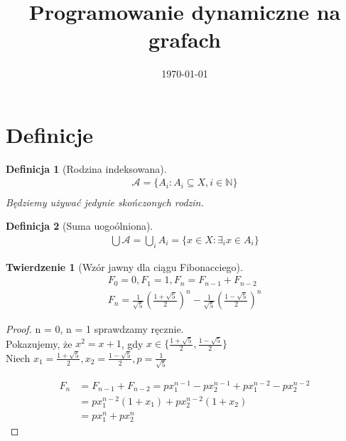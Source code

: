 \documentclass[paper=a4, fontsize=11pt]{article}
\title{	
\huge Programowanie dynamiczne na grafach
}
\date{\normalsize\today}
\begin{document}
\maketitle

\newtheorem{mydef}{Definicja}
\newtheorem{theorem}{Twierdzenie}
\newtheorem{lemma}{Lemat}

\section{Definicje}
\begin{mydef}[Rodzina indeksowana]
\begin{gather*}
\mathcal{A} = \{ A_i : A_i \subseteq X, i \in \mathbb{N} \} \\
\end{gather*}
Będziemy używać jedynie skończonych rodzin.
\end{mydef}
\begin{mydef}[Suma uogoólniona] 
\begin{gather*}
\bigcup \mathcal{A} = \bigcup_i A_i = \{ x \in X : \exists_i x \in A_i \}
\end{gather*}
\end{mydef}

\begin{theorem}[Wzór jawny dla ciągu Fibonacciego]
\begin{gather*}
F_0 = 0, F_1 = 1, F_n = F_{n-1} + F_{n-2} \\
F_n = \frac{1}{\sqrt{5}}(\frac{1 + \sqrt{5}}{2})^n - \frac{1}{\sqrt{5}}(\frac{1 - \sqrt{5}}{2})^n
\end{gather*}
\end{theorem}
\begin{proof}
n = 0, n = 1 sprawdzamy ręcznie. \\
Pokazujemy, że $x^2 = x + 1$, gdy $x \in \{\frac{1 + \sqrt{5}}{2}, \frac{1 - \sqrt{5}}{2}\}$ \\
Niech $x_1 = \frac{1 + \sqrt{5}}{2}, x_2 = \frac{1 - \sqrt{5}}{2}, p = \frac{1}{\sqrt{5}}$

\begin{equation*}
\begin{split}
F_n &= F_{n-1} + F_{n-2} = px_1^{n-1} - px_2^{n-1} + px_1^{n-2} - px_2^{n-2} \\
&= px_1^{n-2}(1 + x_1) + px_2^{n-2}(1 + x_2) \\
&= px_1^n + px_2^n
\end{split}
\end{equation*}
\end{proof}
\end{document}
